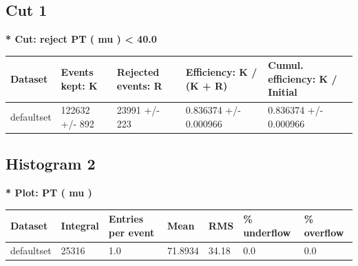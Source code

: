 \documentclass[a4paper, 10pt]{article}
\begin{document}
\subsection{Cut 1}

\textbf{* Cut: reject PT ( mu ) < 40.0}\\
   \begin{table}[H]
  \begin{center}
    \begin{tabular}{|m{20.0mm}|m{27.0mm}|m{27.0mm}|m{33.0mm}|m{32.0mm}|}
      \hline
      {\cellcolor{yellow}         Dataset}& {\cellcolor{yellow}         Events kept:
          K}& {\cellcolor{yellow}         Rejected events:
          R}& {\cellcolor{yellow}         Efficiency:
          K /\- (K + R)}& {\cellcolor{yellow}         Cumul. efficiency:
          K /\- Initial}\\
      \hline
      {\cellcolor{white}         defaultset}& {\cellcolor{white}         122632 +/\-- 892}& {\cellcolor{white}         23991 +/\-- 223}& {\cellcolor{white}         0.836374 +/\-- 0.000966}& {\cellcolor{white}         0.836374 +/\-- 0.000966}\\
\hline
    \end{tabular}
  \end{center}
\end{table}

   \newpage
\subsection{ Histogram 2}

\textbf{* Plot: PT ( mu ) }\\
   \begin{table}[H]
  \begin{center}
    \begin{tabular}{|m{23.0mm}|m{23.0mm}|m{18.0mm}|m{19.0mm}|m{19.0mm}|m{19.0mm}|m{19.0mm}|}
      \hline
      {\cellcolor{yellow}         Dataset}& {\cellcolor{yellow}         Integral}& {\cellcolor{yellow}         Entries per event}& {\cellcolor{yellow}         Mean}& {\cellcolor{yellow}         RMS}& {\cellcolor{yellow}         \% underflow}& {\cellcolor{yellow}         \% overflow}\\
      \hline
      {\cellcolor{white}         defaultset}& {\cellcolor{white}         25316}& {\cellcolor{white}         1.0}& {\cellcolor{white}         71.8934}& {\cellcolor{white}         34.18}& {\cellcolor{green}         0.0}& {\cellcolor{green}         0.0}\\
\hline
    \end{tabular}
  \end{center}
\end{table}
\end{document}

